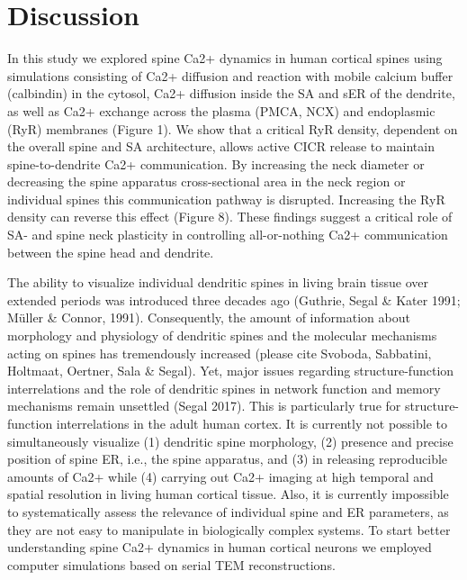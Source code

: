 \documentclass[fleqn,10pt]{wlscirep}
\begin{document}
\section*{Discussion}

In this study we explored spine Ca2+ dynamics in human cortical spines using simulations consisting of Ca2+ diffusion and reaction with mobile calcium buffer (calbindin) in the cytosol, Ca2+ diffusion inside the SA and sER of the dendrite, as well as Ca2+ exchange across the plasma (PMCA, NCX) and endoplasmic (RyR) membranes (Figure 1). We show that a critical RyR density, dependent on the overall spine and SA architecture, allows active CICR release to maintain spine-to-dendrite Ca2+ communication. By increasing the neck diameter or decreasing the spine apparatus cross-sectional area in the neck region or individual spines this communication pathway is disrupted. Increasing the RyR density can reverse this effect (Figure 8). These findings suggest a critical role of SA- and spine neck plasticity in controlling all-or-nothing Ca2+ communication between the spine head and dendrite.

	The ability to visualize individual dendritic spines in living brain tissue over extended periods was introduced three decades ago (Guthrie, Segal \& Kater 1991; Müller \& Connor, 1991). Consequently, the amount of information about morphology and physiology of dendritic spines and the molecular mechanisms acting on spines has tremendously increased (please cite Svoboda, Sabbatini, Holtmaat, Oertner, Sala \& Segal). Yet, major issues regarding structure-function interrelations and the role of dendritic spines in network function and memory mechanisms remain unsettled (Segal 2017). This is particularly true for structure-function interrelations in the adult human cortex. It is currently not possible to simultaneously visualize (1) dendritic spine morphology, (2) presence and precise position of spine ER, i.e., the spine apparatus, and (3) in releasing reproducible amounts of Ca2+ while (4) carrying out Ca2+ imaging at high temporal and spatial resolution in living human cortical tissue. Also, it is currently impossible to systematically assess the relevance of individual spine and ER parameters, as they are not easy to manipulate in biologically complex systems. To start better understanding spine Ca2+ dynamics in human cortical neurons we employed computer simulations based on serial TEM reconstructions.
\end{document}
